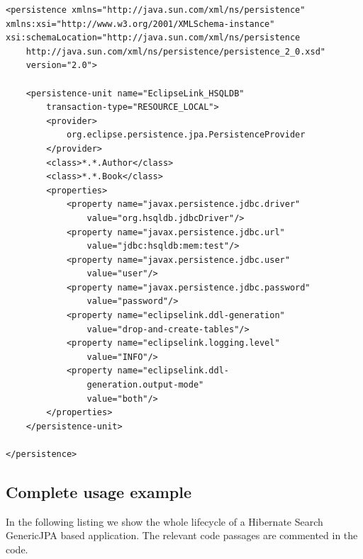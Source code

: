 \lstset{language=xml}
\begin{lstlisting}[frame=htrbl, caption={persistence.xml complete}, label={lst:persistence.xml_complete}]
<persistence xmlns="http://java.sun.com/xml/ns/persistence"
xmlns:xsi="http://www.w3.org/2001/XMLSchema-instance"
xsi:schemaLocation="http://java.sun.com/xml/ns/persistence
	http://java.sun.com/xml/ns/persistence/persistence_2_0.xsd"
	version="2.0">

	<persistence-unit name="EclipseLink_HSQLDB"
		transaction-type="RESOURCE_LOCAL">
		<provider>
			org.eclipse.persistence.jpa.PersistenceProvider
		</provider>
		<class>*.*.Author</class>
		<class>*.*.Book</class>
		<properties>
			<property name="javax.persistence.jdbc.driver"
				value="org.hsqldb.jdbcDriver"/>
			<property name="javax.persistence.jdbc.url"
				value="jdbc:hsqldb:mem:test"/>
			<property name="javax.persistence.jdbc.user"
				value="user"/>
			<property name="javax.persistence.jdbc.password"
				value="password"/>
			<property name="eclipselink.ddl-generation"
				value="drop-and-create-tables"/>
			<property name="eclipselink.logging.level"
				value="INFO"/>
			<property name="eclipselink.ddl-
				generation.output-mode"
				value="both"/>
		</properties>
	</persistence-unit>
	
</persistence>
\end{lstlisting}

\pagebreak

\subsection{Complete usage example}

In the following listing we show the whole lifecycle of a Hibernate Search GenericJPA based application. The relevant code passages are commented in the code.
\\


